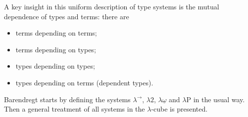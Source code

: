 \documentclass[12pt,toc=bibliography,numbers=noendperiod,
               footnotes=multiple,twoside]{scrartcl}
\begin{document}
A key insight in this uniform description of type systems is the mutual dependence of types and terms: there are

\begin{itemize}
\item terms depending on terms;
\item terms depending on types;
\item types depending on types;
\item types depending on terms (dependent types).
\end{itemize}

Barendregt starts by defining the systems \(\lambda^{\rightarrow}\), \(\lambda\textrm{2}\), \(\lambda\underline{\omega}\) and \(\lambda\textrm{P}\) in the usual way. Then a general treatment of all systems in the \(\lambda\)-cube is presented.
\end{document}
